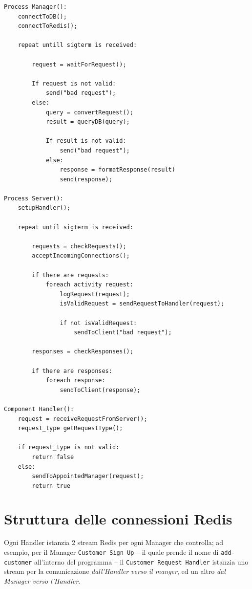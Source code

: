 \documentclass[12pt]{report}
\begin{document}
    \begin{verbatim}
Process Manager():
    connectToDB();
    connectToRedis();

    repeat untill sigterm is received:

        request = waitForRequest();

        If request is not valid:
            send("bad request");
        else:
            query = convertRequest();
            result = queryDB(query);

            If result is not valid:
                send("bad request");
            else:
                response = formatResponse(result)
                send(response);
                
Process Server():
    setupHandler();
    
    repeat until sigterm is received:

        requests = checkRequests();
        acceptIncomingConnections();
        
        if there are requests:
            foreach activity request:
                logRequest(request);
                isValidRequest = sendRequestToHandler(request);
               
                if not isValidRequest: 
                    sendToClient("bad request");

        responses = checkResponses();

        if there are responses:
            foreach response:
                sendToClient(response);
                
Component Handler():
    request = receiveRequestFromServer();
    request_type getRequestType();

    if request_type is not valid:
        return false
    else:
        sendToAppointedManager(request);
        return true
    \end{verbatim}
    

    \section{Struttura delle connessioni Redis}

    Ogni Handler istanzia 2 stream Redis per ogni Manager che controlla; ad esempio, per il Manager \texttt{Customer Sign Up} -- il quale prende il nome di \texttt{add-customer} all'interno del programma -- il \texttt{Customer Request Handler} istanzia uno stream per la comunicazione \textit{dall'Handler verso il manger}, ed un altro \textit{dal Manager verso l'Handler}.
\end{document}
